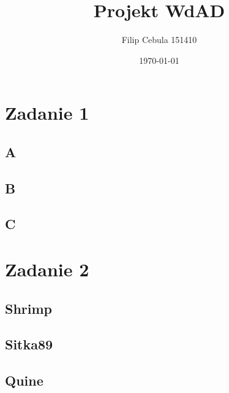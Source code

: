 \documentclass[11pt]{article}
\title{Projekt WdAD}
\author{Filip Cebula 151410}
\date{\today}
\begin{document}
\maketitle
\pagebreak

\section{Zadanie 1}

\subsection{A}
\subsection{B}
\subsection{C}

\section{Zadanie 2}

\subsection{Shrimp}
\subsection{Sitka89}
\subsection{Quine}
\end{document}
